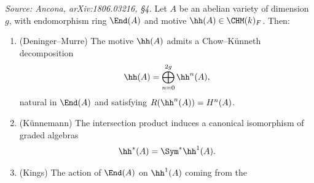 \begin{theorem}
  \label{thm:classic-motive}
  \textit{Source: Ancona, arXiv:1806.03216, §4.}
  Let \(A\) be an abelian variety of dimension \(g\), with endomorphism ring
  \(\End(A)\) and motive \(\hh(A) \in \CHM(k)_{F}\). Then:
  \begin{enumerate}
    \item (Deninger--Murre) The motive \(\hh(A)\) admits a Chow--K\"unneth
      decomposition
      \[\hh(A) = \bigoplus_{n=0}^{2g} \hh^n(A),\]
      natural in \(\End(A)\) and satisfying \(R(\hh^n(A)) = H^n(A)\).
    \item (K\"unnemann) The intersection product induces a canonical isomorphism
      of graded algebras
      \[\hh^*(A) = \Sym^* \hh^1(A).\]
    \item (Kings) The action of \(\End(A)\) on \(\hh^1(A)\) coming from the

\end{enumerate}
\end{theorem}

